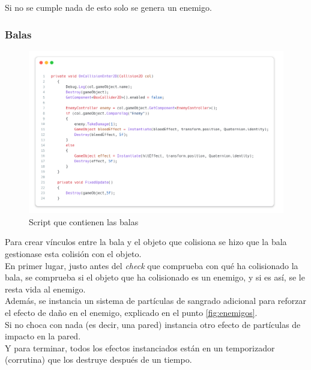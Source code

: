 \documentclass[11pt]{article}
\begin{document}
                Si no se cumple nada de esto solo se genera un enemigo.\\


            \newpage
            \subsubsection{Balas}
                \begin{figure}[H]
                    \centering
                    \includegraphics[width=\textwidth]{Images/Misc/bullet.png}
                    \caption{Script que contienen las balas}
                \end{figure}

                Para crear vínculos entre la bala y el objeto que colisiona se hizo que la bala gestionase esta colisión con el objeto.\\

                En primer lugar, justo antes del \textit{check} que comprueba con qué ha colisionado la bala, se comprueba si el objeto que ha colisionado es un enemigo, y si es así, se le resta vida al enemigo.\\
                
                Además, se instancia un sistema de partículas de sangrado adicional para reforzar el efecto de daño en el enemigo, explicado en el punto \ref{fig:enemigos}. \\

                Si no choca con nada (es decir, una pared) instancia otro efecto de partículas de impacto en la pared.\\

                Y para terminar, todos los efectos instanciados están en un temporizador (corrutina) que los destruye después de un tiempo.\\
\end{document}
